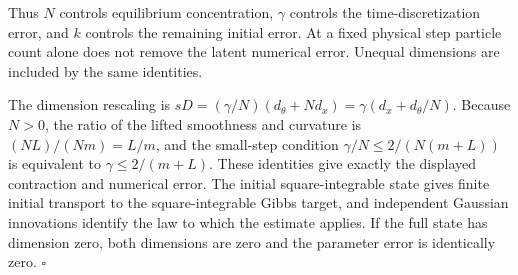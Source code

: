 \documentclass[11pt,a4paper]{article}
\begin{document}
Thus \(N\) controls equilibrium concentration, \(\gamma\) controls the time-discretization error, and \(k\) controls the remaining initial error. At a fixed physical step particle count alone does not remove the latent numerical error. Unequal dimensions are included by the same identities.




The dimension rescaling is \(sD=(\gamma/N)(d_\theta+Nd_x)=\gamma(d_x+d_\theta/N)\). Because \(N>0\), the ratio of the lifted smoothness and curvature is \((NL)/(Nm)=L/m\), and the small-step condition \(\gamma/N\le2/(N(m+L))\) is equivalent to \(\gamma\le2/(m+L)\). These identities give exactly the displayed contraction and numerical error. The initial square-integrable state gives finite initial transport to the square-integrable Gibbs target, and independent Gaussian innovations identify the law to which the estimate applies. If the full state has dimension zero, both dimensions are zero and the parameter error is identically zero. \(\square\)
\end{document}
